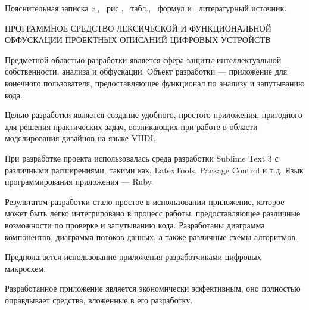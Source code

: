 \thispagestyle{empty}


Пояснительная записка \pageref*{LastPage}c., \totfig{}~рис., \tottab{}~табл., \toteq{}~формул и \totref{}~литературный источник.

ПРОГРАММНОЕ СРЕДСТВО ЛЕКСИЧЕСКОЙ И ФУНКЦИОНАЛЬНОЙ ОБФУСКАЦИИ ПРОЕКТНЫХ ОПИСАНИЙ ЦИФРОВЫХ УСТРОЙСТВ

Предметной областью разработки является сфера защиты интеллектуальной собственности, анализа и обфускации. Объект разработки --- приложение для конечного пользователя, предоставляющее функционал по анализу и запутыванию кода.

Целью разработки является создание удобного, простого приложения, пригодного для решения практических задач, возникающих при работе в области моделирования дизайнов на языке VHDL.

При разработке проекта использовалась среда разработки Sublime Text 3 с различными расширениями, такими как, LatexTools, Package Control и т.д. Язык программирования приложения --- Ruby.


Результатом разработки стало простое в использовании приложение, которое может быть легко интегрировано в процесс работы, предоставляющее различные возможности по проверке и запутыванию кода. Разработаны диаграмма компонентов, диаграмма потоков данных, а также различные схемы алгоритмов.

Предполагается использование приложения разработчиками цифровых микросхем.

Разработанное приложение является экономически эффективным, оно полностью  оправдывает средства, вложенные в его разработку.





\clearpage
